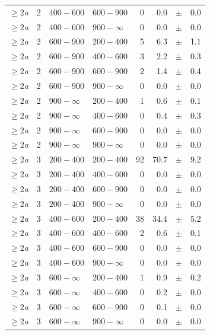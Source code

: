 \begin{table}[!h]
\begin{tabular}{rrllrrcl}
$\geq 2${\it a} & 2 & $ 400- 600$ & $600-900$ &      0 &      0.0 &$\pm$&    0.0 \\
$\geq 2${\it a} & 2 & $ 400- 600$ & $900-\infty$ &      0 &      0.0 &$\pm$&    0.0 \\
$\geq 2${\it a} & 2 & $ 600- 900$ & $200-400$ &      5 &      6.3 &$\pm$&    1.1 \\
$\geq 2${\it a} & 2 & $ 600- 900$ & $400-600$ &      3 &      2.2 &$\pm$&    0.3 \\
$\geq 2${\it a} & 2 & $ 600- 900$ & $600-900$ &      2 &      1.4 &$\pm$&    0.4 \\
$\geq 2${\it a} & 2 & $ 600- 900$ & $900-\infty$ &      0 &      0.0 &$\pm$&    0.0 \\
$\geq 2${\it a} & 2 & $ 900- \infty$ & $200-400$ &      1 &      0.6 &$\pm$&    0.1 \\
$\geq 2${\it a} & 2 & $ 900- \infty$ & $400-600$ &      0 &      0.4 &$\pm$&    0.3 \\
$\geq 2${\it a} & 2 & $ 900- \infty$ & $600-900$ &      0 &      0.0 &$\pm$&    0.0 \\
$\geq 2${\it a} & 2 & $ 900- \infty$ & $900-\infty$ &      0 &      0.0 &$\pm$&    0.0 \\
$\geq 2${\it a} & 3 & $ 200- 400$ & $200-400$ &     92 &     70.7 &$\pm$&    9.2 \\
$\geq 2${\it a} & 3 & $ 200- 400$ & $400-600$ &      0 &      0.0 &$\pm$&    0.0 \\
$\geq 2${\it a} & 3 & $ 200- 400$ & $600-900$ &      0 &      0.0 &$\pm$&    0.0 \\
$\geq 2${\it a} & 3 & $ 200- 400$ & $900-\infty$ &      0 &      0.0 &$\pm$&    0.0 \\
$\geq 2${\it a} & 3 & $ 400- 600$ & $200-400$ &     38 &     34.4 &$\pm$&    5.2 \\
$\geq 2${\it a} & 3 & $ 400- 600$ & $400-600$ &      2 &      0.6 &$\pm$&    0.1 \\
$\geq 2${\it a} & 3 & $ 400- 600$ & $600-900$ &      0 &      0.0 &$\pm$&    0.0 \\
$\geq 2${\it a} & 3 & $ 400- 600$ & $900-\infty$ &      0 &      0.0 &$\pm$&    0.0 \\
$\geq 2${\it a} & 3 & $ 600- \infty$ & $200-400$ &      1 &      0.9 &$\pm$&    0.2 \\
$\geq 2${\it a} & 3 & $ 600- \infty$ & $400-600$ &      0 &      0.2 &$\pm$&    0.0 \\
$\geq 2${\it a} & 3 & $ 600- \infty$ & $600-900$ &      0 &      0.1 &$\pm$&    0.0 \\
$\geq 2${\it a} & 3 & $ 600- \infty$ & $900-\infty$ &      0 &      0.0 &$\pm$&    0.0 \\
    \hline
  \end{tabular}
\end{table}


